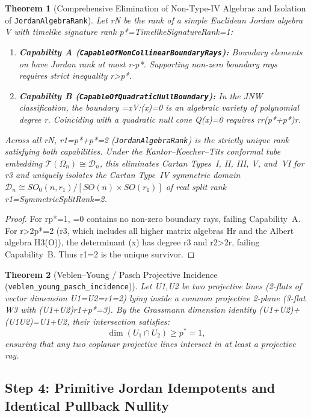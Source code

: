 \documentclass[11pt,reqno]{amsart}
\newtheorem{theorem}{Theorem}[section]
\theoremstyle{definition}
\theoremstyle{remark}
\begin{document}
\begin{theorem}[Comprehensive Elimination of Non-Type-IV Algebras and Isolation of \texttt{JordanAlgebraRank}]
\label{thm:jordan_rank}
Let rN be the rank of a simple Euclidean Jordan algebra V with timelike signature rank p*=TimelikeSignatureRank=1:
\begin{enumerate}[label=(\alph*)]
  \item \textbf{Capability A (\texttt{CapableOfNonCollinearBoundaryRays}):} Boundary elements on  have Jordan rank at most r-p*. Supporting non-zero boundary rays requires strict inequality r>p*.
  \item \textbf{Capability B (\texttt{CapableOfQuadraticNullBoundary}):} In the JNW classification, the boundary ={xV:(x)=0} is an algebraic variety of polynomial degree r. Coinciding with a quadratic null cone Q(x)=0 requires rr(p*+p*)r.
\end{enumerate}
Across all rN, r1=p*+p*=2 (\texttt{JordanAlgebraRank}) is the strictly unique rank satisfying both capabilities. Under the Kantor--Koecher--Tits conformal tube embedding $\mathcal{T}(\Omega_n) \cong \mathcal{D}_n$, this eliminates Cartan Types~I, II, III, V, and~VI for r3 and uniquely isolates the Cartan Type~IV symmetric domain $\mathcal{D}_n \cong SO_0(n, r_1)/[SO(n)\times SO(r_1)]$ of real split rank r1=SymmetricSplitRank=2.
\end{theorem}
\begin{proof}
For rp*=1, ={0} contains no non-zero boundary rays, failing Capability~A. For r>2p*=2 (r3, which includes all higher matrix algebras Hr and the Albert algebra H3(O)), the determinant (x) has degree r3 and r2>2r, failing Capability~B. Thus r1=2 is the unique survivor.
\end{proof}

\begin{theorem}[Veblen--Young / Pasch Projective Incidence (\texttt{veblen\_young\_pasch\_incidence})]
\label{thm:veblen_young}
Let U1,U2 be two projective lines (2-flats of vector dimension U1=U2=r1=2) lying inside a common projective 2-plane (3-flat W3 with (U1+U2)r1+p*=3). By the Grassmann dimension identity (U1+U2)+(U1U2)=U1+U2, their intersection satisfies:
\begin{equation}
  \dim(U_1 \cap U_2) \ge p^* = 1,
\end{equation}
ensuring that any two coplanar projective lines intersect in at least a projective ray.
\end{theorem}

\subsection{Step 4: Primitive Jordan Idempotents and Identical Pullback Nullity}
\end{document}
